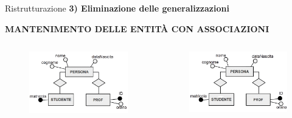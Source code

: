 \begin{frame}{Ristrutturazione}
\textbf{3) Eliminazione delle generalizzazioni}
\\\vspace{2em}
\begin{center}
    \textbf{MANTENIMENTO DELLE ENTIT\`A CON ASSOCIAZIONI}
\end{center}
\begin{columns}
        \begin{column}{0.5\textwidth}
            \begin{figure}[h]
        \centering
        \includegraphics[width=1\textwidth]{img/i6.png}
    \end{figure}
        \end{column}
        \begin{column}{0.5\textwidth}
            \begin{figure}[h]
        \centering
        \includegraphics[width=1\textwidth]{img/i7.png}
    \end{figure}
        \end{column}
    \end{columns}
\end{frame} 
